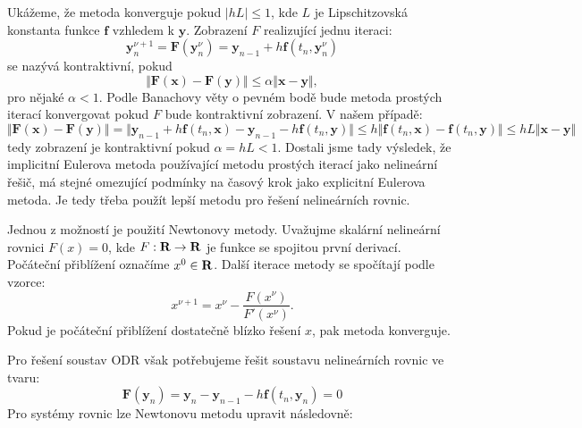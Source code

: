 \documentclass[a4paper, 12pt]{book}
\theoremstyle{definition}
\def\to{\rightarrow}
\def\Real{{\rm\bf R}}
\def\vc#1{\mathbf{\boldsymbol{#1}}}     %
\def\abs#1{\lvert#1\rvert}
\def\norm#1{\bigl\Vert#1\bigr\Vert} %
\begin{document}
Ukážeme, že metoda konverguje pokud $\abs{hL}\le 1$, kde $L$ je Lipschitzovská konstanta funkce $\vc f$ vzhledem k $\vc y$. Zobrazení $F$ realizující 
jednu iteraci:
\[
    \vc y_n^{\nu+1} = \vc F(\vc y_n^\nu) = \vc y_{n-1} + h \vc f(t_n, \vc y_n^{\nu})
\]
se nazývá kontraktivní, pokud 
\[
    \norm{\vc F(\vc x) - \vc F(\vc y)} \le \alpha\norm{\vc x - \vc y},
\]
pro nějaké $\alpha<1$. Podle Banachovy věty o pevném bodě bude metoda prostých iterací konvergovat pokud $F$ bude kontraktivní zobrazení.
V našem případě:
\[
    \norm{\vc F(\vc x) - \vc F(\vc y)} = \norm{\vc y_{n-1} + h \vc f(t_n, \vc x) - \vc y_{n-1} - h \vc f(t_n, \vc y)}
    \le h\norm{\vc f(t_n, \vc x) - \vc f(t_n, \vc y)} \le hL\norm{\vc x - \vc y}
\]
tedy zobrazení je kontraktivní pokud $\alpha = hL < 1$.
Dostali jsme tady výsledek, že implicitní Eulerova metoda používající metodu prostých iterací jako nelineární řešič, má stejné omezující podmínky na časový krok
jako explicitní Eulerova metoda. Je tedy třeba použít lepší metodu pro řešení nelineárních rovnic.

Jednou z možností je použití Newtonovy metody. Uvažujme skalární nelineární rovnici $F(x)=0$, kde
$F:\Real \to \Real$ je funkce se spojitou první derivací. Počáteční přiblížení označíme $x^0\in \Real$.
Další iterace metody se spočítají podle vzorce:
\[
    x^{\nu+1} = x^{\nu} - \frac{F(x^\nu)}{F'(x^\nu)}.
\]
Pokud je počáteční přiblížení dostatečně blízko řešení $x$, pak metoda konverguje.

Pro řešení soustav ODR však potřebujeme řešit soustavu nelineárních rovnic ve tvaru:
\[
    \vc F(\vc y_n) = \vc y_n - \vc y_{n-1} -h\vc f(t_n, \vc y_n) = 0
\]
Pro systémy rovnic lze Newtonovu metodu upravit následovně:
\end{document}
